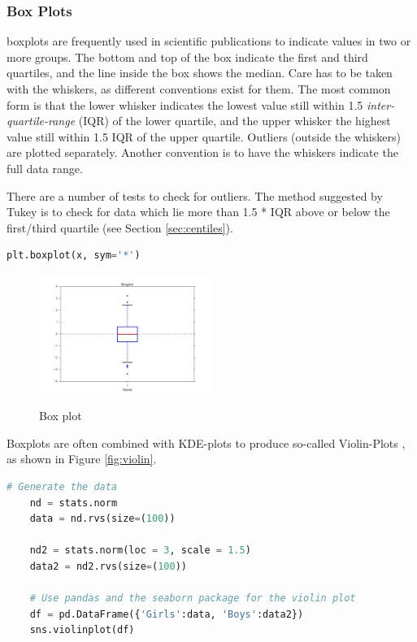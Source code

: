 \subsubsection{Box Plots}

\Glspl{boxplot} are frequently used in scientific publications to indicate values in two or more groups. The bottom and top of the box indicate the first and third \glspl{quartile}, and the line inside the box shows the median. Care has to be taken with the whiskers, as different conventions exist for them. The most common form is that the lower whisker indicates the lowest value still within 1.5 \emph{inter-quartile-range} (IQR) of the lower quartile, and the upper whisker the highest value still within 1.5 IQR of the upper quartile. Outliers (outside the whiskers) are plotted separately. Another convention is to have the whiskers indicate the full data range.

There are a number of tests to check for outliers. The method suggested by Tukey is to check for data which lie more than 1.5 * IQR above or below the first/third quartile (see Section \ref{sec:centiles}).

\begin{lstlisting}[language=Python]
    plt.boxplot(x, sym='*')
\end{lstlisting}

\begin{figure}[H]
  \centering
  \includegraphics[width=0.5\textwidth]{../Images/boxplot.png}\\
  \caption{Box plot}\label{fig:Boxplot}
\end{figure}

Boxplots are often combined with KDE-plots to produce so-called Violin-Plots , as shown in Figure \ref{fig:violin}.

\begin{lstlisting}[language=Python]
    # Generate the data
    nd = stats.norm
    data = nd.rvs(size=(100))

    nd2 = stats.norm(loc = 3, scale = 1.5)
    data2 = nd2.rvs(size=(100))

    # Use pandas and the seaborn package for the violin plot
    df = pd.DataFrame({'Girls':data, 'Boys':data2})
    sns.violinplot(df)
\end{lstlisting}

